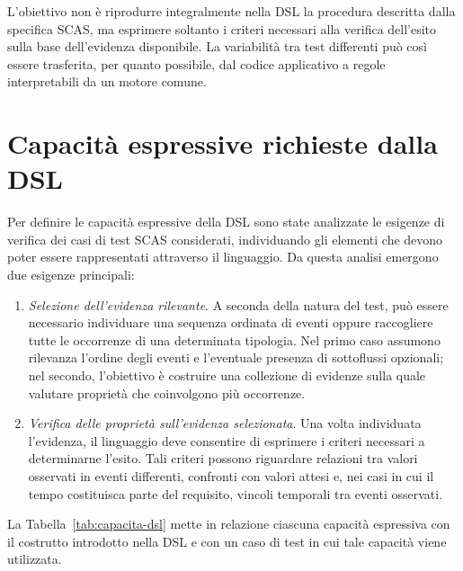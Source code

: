 L'obiettivo non è riprodurre integralmente nella DSL la procedura descritta dalla specifica SCAS, ma esprimere soltanto i criteri necessari alla verifica dell'esito sulla base dell'evidenza disponibile. La variabilità tra test differenti può così essere trasferita, per quanto possibile, dal codice applicativo a regole interpretabili da un motore comune.


\section{Capacità espressive richieste dalla DSL}\label{capacituxe0-espressive-richieste-dalla-dsl}

Per definire le capacità espressive della DSL sono state analizzate le esigenze di verifica dei casi di test SCAS considerati, individuando gli elementi che devono poter essere rappresentati attraverso il linguaggio. Da questa analisi emergono due esigenze principali:

\begin{enumerate}
\def\labelenumi{\arabic{enumi}.}
\item
  \emph{Selezione dell'evidenza rilevante}. A seconda della natura del test, può essere necessario individuare una sequenza ordinata di eventi oppure raccogliere tutte le occorrenze di una determinata tipologia. Nel primo caso assumono rilevanza l'ordine degli eventi e l'eventuale presenza di sottoflussi opzionali; nel secondo, l'obiettivo è costruire una collezione di evidenze sulla quale valutare proprietà che coinvolgono più occorrenze.
\item
  \emph{Verifica delle proprietà sull'evidenza selezionata}. Una volta individuata l'evidenza, il linguaggio deve consentire di esprimere i criteri necessari a determinarne l'esito. Tali criteri possono riguardare relazioni tra valori osservati in eventi differenti, confronti con valori attesi e, nei casi in cui il tempo costituisca parte del requisito, vincoli temporali tra eventi osservati.
\end{enumerate}

La Tabella~\ref{tab:capacita-dsl} mette in relazione
ciascuna capacità espressiva con il costrutto introdotto
nella DSL e con un caso di test in cui tale capacità
viene utilizzata.


